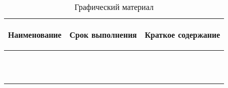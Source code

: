 \begin{table} [h!]
  \caption{
    Графический материал
  }\label{tbl:plan_graphics}
  \small{
    \begin{tabular}{| m{4.8cm} | c | m{7cm} |}
      \hline
      \begin{center} Наименование \end{center}
      & Срок выполнения
      & \begin{center} Краткое содержание \end{center} \\
      \hline

      & & \\ \hline
      & & \\ \hline
      & & \\ \hline
      & & \\ \hline
      & & \\ \hline
      & & \\ \hline
      & & \\ \hline
      & & \\ \hline
      & & \\ \hline
      & & \\ \hline
      & & \\ \hline
    \end{tabular}
  }
\end{table}

